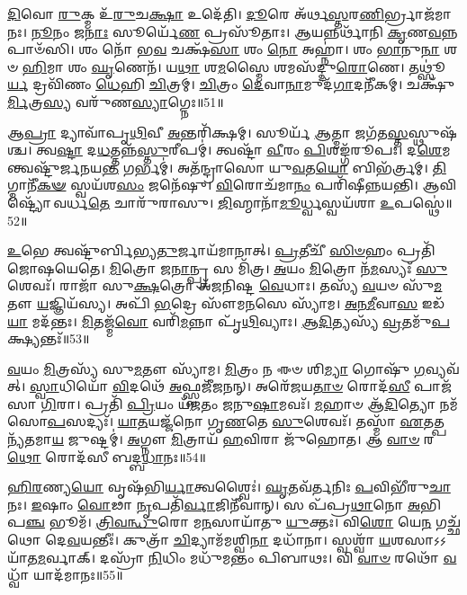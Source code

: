 \-\ul{𑌦𑌿}\-𑌵𑍋 \ul{𑌰𑍁}\-𑌕𑍍𑌮 𑌉᳴\-\ul{𑌰𑍁}\-𑌚\-\ul{𑌕𑍍𑌷𑌾} 𑌉𑌦𑍇᳴𑌤𑌿।
\-\ul{𑌦𑍂}\-𑌰𑍇 𑌅᳴𑌰𑍍𑌥\-\ul{𑌸𑍍𑌤}\-𑌰\-\ul{𑌣𑌿}\-𑌰𑍍𑌭𑍍𑌰𑌾𑌜᳴𑌮𑌾𑌨𑌃।
\-\ul{𑌨𑍂}\-𑌨𑌂 𑌜\-\ul{𑌨𑌾𑌃} 𑌸𑍂𑌰𑍍𑌯𑍇᳴\-\ul{𑌣} 𑌪𑍍𑌰𑌸𑍂᳴𑌤𑌾𑌃।
𑌆𑌯𑌨𑍍𑌨𑌰𑍍𑌥𑌾᳴𑌨𑌿 \ul{𑌕𑍃}\-𑌣\-\ul{𑌵}\-𑌨𑍍𑌨𑌪𑌾𑍞᳴𑌸𑌿।
𑌶𑌂 𑌨𑍋᳴ 𑌭\-\ul{𑌵} 𑌚𑌕𑍍𑌷᳴\-\ul{𑌸𑌾} 𑌶𑌂 \ul{𑌨𑍋} 𑌅𑌹𑍍𑌨𑌾॑।
𑌶𑌂 \ul{𑌭𑌾}\-𑌨𑍁\-\ul{𑌨𑌾} 𑌶𑍞 \ul{𑌹𑌿}\-𑌮𑌾 𑌶𑌂 \ul{𑌘𑍃}\-𑌣𑍇𑌨᳴।
𑌯\-\ul{𑌥𑌾} 𑌶\-\ul{𑌮}\-𑌸𑍍𑌮𑍈 𑌶𑌮𑌸᳴𑌦𑍍𑌦𑍁\-\ul{𑌰𑍋}\-𑌣𑍇।
𑌤𑌥𑍍𑌸𑍂॑\-\ul{𑌰𑍍𑌯} 𑌦𑍍𑌰𑌵𑌿᳴𑌣𑌂 \ul{𑌧𑍇}\-𑌹𑌿 \ul{𑌚𑌿}\-𑌤𑍍𑌰𑌮𑍍।
\-\ul{𑌚𑌿}\-𑌤𑍍𑌰𑌂 \ul{𑌦𑍇}\-𑌵𑌾\-\ul{𑌨𑌾}\-𑌮𑍁𑌦᳴\-\ul{𑌗𑌾}\-𑌦𑌨𑍀᳴𑌕𑌮𑍍।
𑌚𑌕𑍍𑌷𑍁᳴\-\ul{𑌰𑍍𑌮𑌿}\-𑌤𑍍𑌰\-\ul{𑌸𑍍𑌯} 𑌵𑌰𑍁᳴𑌣\-\ul{𑌸𑍍𑌯𑌾}\-𑌗𑍍𑌨𑍇𑌃॥51॥

𑌆\-\ul{𑌪𑍍𑌰𑌾} 𑌦𑍍𑌯𑌾𑌵𑌾᳴𑌪𑍃\-\ul{𑌥𑌿}\-𑌵𑍀 \ul{𑌅}\-𑌨𑍍𑌤𑌰𑌿᳴𑌕𑍍𑌷𑌮𑍍।
𑌸𑍂𑌰𑍍𑌯᳴ \ul{𑌆}\-𑌤𑍍𑌮𑌾 𑌜𑌗᳴𑌤\-\ul{𑌸𑍍𑌤}\-𑌸𑍍𑌥𑍁𑌷᳴𑌶𑍍𑌚।
𑌤𑍍𑌵\-\ul{𑌷𑍍𑌟𑌾} 𑌦\-\ul{𑌧}\-𑌤𑍍𑌤𑌨𑍍𑌨᳴\-\ul{𑌸𑍍𑌤𑍁}\-𑌰𑍀𑌪𑌮𑍍॑।
𑌤𑍍𑌵𑌷𑍍𑌟𑌾᳴ \ul{𑌵𑍀}\-𑌰𑌂 \ul{𑌪𑌿}\-𑌶𑌙𑍍𑌗᳴𑌰𑍂𑌪𑌃।
𑌦\-\ul{𑌶𑍇}\-𑌮𑌨𑍍𑌤𑍍𑌵𑌷𑍍𑌟𑍁᳴𑌰𑍍𑌜𑌨𑌯\-\ul{𑌨𑍍𑌤} 𑌗𑌰𑍍𑌭𑌮𑍍॑।
𑌅𑌤᳴𑌨𑍍𑌦𑍍𑌰𑌾𑌸𑍋 𑌯𑍁\-\ul{𑌵}\-𑌤\-\ul{𑌯𑍋} 𑌬𑌿𑌭᳴𑌰𑍍𑌤𑍍𑌰𑌮𑍍।
\-\ul{𑌤𑌿}\-𑌗𑍍𑌮𑌾𑌨𑍀᳴\-\ul{𑌕}\-\-\ul{𑍟} 𑌸𑍍𑌵𑌯᳴𑌶\-\ul{𑌸𑌂} 𑌜𑌨𑍇᳴𑌷𑍁।
\-\ul{𑌵𑌿}\-𑌰𑍋𑌚᳴𑌮𑌾\-\ul{𑌨𑌂} 𑌪𑌰𑌿᳴𑌷𑍀𑌨𑍍𑌨𑌯𑌨𑍍𑌤𑌿।
𑌆𑌵𑌿𑌷𑍍𑌟𑍍𑌯𑍋᳴ 𑌵𑌰𑍍𑌧\-\ul{𑌤𑍇} 𑌚𑌾𑌰𑍁᳴𑌰𑌾𑌸𑍁।
\-\ul{𑌜𑌿}\-𑌹𑍍𑌮𑌾𑌨𑌾᳴\-\ul{𑌮𑍂}\-𑌰𑍍𑌧𑍍𑌵𑌸𑍍𑌵𑌯᳴𑌶𑌾 \ul{𑌉}\-𑌪𑌸𑍍𑌥𑍇॑॥52॥

\-\ul{𑌉}\-𑌭𑍇 𑌤𑍍𑌵𑌷𑍍𑌟𑍁᳴𑌰𑍍𑌬𑌿𑌭𑍍𑌯\-\ul{𑌤𑍁}\-𑌰𑍍𑌜𑌾𑌯᳴𑌮𑌾𑌨𑌾𑌤𑍍।
\-\ul{𑌪𑍍𑌰}\-𑌤𑍀𑌚𑍀᳴ \ul{𑌸𑌿}\-\-\ul{𑍞}\-𑌹𑌂 𑌪𑍍𑌰𑌤𑌿᳴\-𑌜𑍋𑌷𑌯𑍇𑌤𑍇।
\-\ul{𑌮𑌿}\-𑌤𑍍𑌰𑍋 𑌜\-\ul{𑌨𑌾}\-𑌨𑍍𑌪𑍍𑌰 𑌸 𑌮𑌿᳴𑌤𑍍𑌰।
\-\ul{𑌅}\-𑌯𑌂 \ul{𑌮𑌿}\-𑌤𑍍𑌰𑍋 𑌨᳴\-\ul{𑌮}\-𑌸𑍍𑌯𑌃᳴ \ul{𑌸𑍁}\-𑌶𑍇𑌵𑌃᳴।
𑌰𑌾𑌜𑌾᳴ 𑌸𑍁\-\ul{𑌕𑍍𑌷}\-𑌤𑍍𑌰𑍋 𑌅᳴𑌜𑌨𑌿𑌷𑍍𑌟 \ul{𑌵𑍇}\-𑌧𑌾𑌃।
𑌤𑌸𑍍𑌯᳴ \ul{𑌵}\-𑌯𑍞 𑌸𑍁᳴\-\ul{𑌮}\-𑌤𑍗 \ul{𑌯}\-𑌜𑍍𑌞𑌿𑌯᳴𑌸𑍍𑌯।
𑌅𑌪𑌿᳴ \ul{𑌭}\-𑌦𑍍𑌰𑍇 𑌸𑍗᳴𑌮\-\ul{𑌨}\-𑌸𑍇 𑌸𑍍𑌯𑌾᳴𑌮।
\-\ul{𑌅}\-\-\ul{𑌨}\-\-\ul{𑌮𑍀}\-𑌵𑌾\-\ul{𑌸} 𑌇𑌡᳴\-\ul{𑌯𑌾} 𑌮𑌦᳴𑌨𑍍𑌤𑌃।
\-\ul{𑌮𑌿}\-𑌤𑌜𑍍𑌮᳴\-\ul{𑌵𑍋} 𑌵𑌰𑌿᳴\-\ul{𑌮}\-𑌨𑍍𑌨𑌾 𑌪𑍃᳴\-\ul{𑌥𑌿}\-𑌵𑍍𑌯𑌾𑌃।
\-\ul{𑌆}\-\-\ul{𑌦𑌿}\-𑌤𑍍𑌯𑌸𑍍𑌯᳴ \ul{𑌵𑍍𑌰}\-𑌤𑌮𑍁᳴\-\ul{𑌪}\-𑌕𑍍𑌷𑍍𑌯𑌨𑍍𑌤𑌃᳴॥53॥

\-\ul{𑌵}\-𑌯𑌂 \ul{𑌮𑌿}\-𑌤𑍍𑌰𑌸𑍍𑌯᳴ 𑌸𑍁\-\ul{𑌮}\-𑌤𑍗 𑌸𑍍𑌯𑌾᳴𑌮।
\-\ul{𑌮𑌿}\-𑌤𑍍𑌰𑌂 𑌨 𑌈𑍞 𑌶𑌿\-\ul{𑌮𑍍𑌯𑌾} 𑌗𑍋𑌷𑍁᳴ \ul{𑌗}\-𑌵𑍍𑌯𑌵᳴𑌤𑍍।
\-\ul{𑌸𑍍𑌵𑌾}\-𑌧𑌿𑌯𑍋᳴ \ul{𑌵𑌿}\-𑌦𑌥𑍇᳴ \ul{𑌅}\-𑌫𑍍𑌸𑍍𑌵𑌜𑍀᳴𑌜𑌨𑌨𑍍।
𑌅𑌰𑍇᳴𑌜𑌯\-\ul{𑌤𑌾}\-\-\ul{𑍞} 𑌰𑍋𑌦᳴\-\ul{𑌸𑍀} 𑌪𑌾𑌜᳴𑌸𑌾 \ul{𑌗𑌿}\-𑌰𑌾।
𑌪𑍍𑌰𑌤𑌿᳴ \ul{𑌪𑍍𑌰𑌿}\-𑌯𑌂 𑌯᳴\-\ul{𑌜}\-𑌤𑌂 \ul{𑌜}\-𑌨𑍁\-\ul{𑌷𑌾}\-𑌮𑌵𑌃᳴।
\-\ul{𑌮}\-𑌹𑌾𑍞 𑌆᳴\-\ul{𑌦𑌿}\-𑌤𑍍𑌯𑍋 𑌨𑌮᳴𑌸𑍋\-\ul{𑌪}\-𑌸𑌦𑍍𑌯𑌃᳴।
\-\ul{𑌯𑌾}\-\-\ul{𑌤}\-𑌯𑌜𑍍𑌜᳴𑌨𑍋 𑌗𑍃\-\ul{𑌣}\-𑌤𑍇 \ul{𑌸𑍁}\-𑌶𑍇𑌵𑌃᳴।
𑌤𑌸𑍍𑌮𑌾᳴ \ul{𑌏}\-𑌤𑌤𑍍𑌪𑌨𑍍𑌯᳴𑌤𑌮𑌾\-\ul{𑌯} 𑌜𑍁𑌷𑍍𑌟𑌮𑍍॑।
\-\ul{𑌅}\-𑌗𑍍𑌨𑍗 \ul{𑌮𑌿}\-𑌤𑍍𑌰𑌾𑌯᳴ \ul{𑌹}\-𑌵𑌿𑌰𑌾 𑌜𑍁᳴𑌹𑍋𑌤।
𑌆 \ul{𑌵𑌾}\-\-\ul{𑍞} 𑌰\-\ul{𑌥𑍋} 𑌰𑍋𑌦᳴𑌸𑍀 𑌬𑌦𑍍𑌬\-\ul{𑌧𑌾}\-𑌨𑌃॥54॥

\-\ul{𑌹𑌿}\-\-\ul{𑌰}\-𑌣𑍍𑌯\-\ul{𑌯𑍋} 𑌵𑍃𑌷᳴𑌭𑌿\-\ul{𑌰𑍍𑌯𑌾}\-𑌤𑍍𑌵𑌶𑍍𑌵𑍈𑌃॑।
\-\ul{𑌘𑍃}\-𑌤𑌵᳴𑌰𑍍𑌤𑌨𑌿𑌃 \ul{𑌪}\-𑌵𑌿𑌭𑍀᳴𑌰𑍁\-\ul{𑌚𑌾}\-𑌨𑌃।
\-\ul{𑌇}\-𑌷𑌾𑌂 \ul{𑌵𑍋}\-𑌢𑌾 \ul{𑌨𑍃}\-𑌪𑌤𑌿᳴\-\ul{𑌰𑍍𑌵𑌾}\-𑌜𑌿𑌨𑍀᳴𑌵𑌾𑌨𑍍।
𑌸 𑌪᳴𑌪𑍍𑌰\-\ul{𑌥𑌾}\-𑌨𑍋 \ul{𑌅}\-𑌭𑌿 𑌪\-\ul{𑌞𑍍𑌚} 𑌭𑍂𑌮᳴।
\-\ul{𑌤𑍍𑌰𑌿}\-\-\ul{𑌵}\-\-\ul{𑌨𑍍𑌧𑍁}\-𑌰𑍋 𑌮\-\ul{𑌨}\-𑌸𑌾𑌯𑌾᳴𑌤𑍁 \ul{𑌯𑍁}\-𑌕𑍍𑌤𑌃।
𑌵𑌿\-\ul{𑌶𑍋} 𑌯𑍇\-\ul{𑌨} 𑌗𑌚𑍍𑌛᳴𑌥𑍋 𑌦𑍇\-\ul{𑌵}\-𑌯𑌨𑍍𑌤𑍀𑌃॑।
𑌕𑍁𑌤𑍍𑌰𑌾᳴ \ul{𑌚𑌿}\-𑌦𑍍𑌯𑌾𑌮᳴𑌮𑌶𑍍𑌵𑌿\-\ul{𑌨𑌾} 𑌦𑌧𑌾᳴𑌨𑌾।
𑌸𑍍𑌵𑌶𑍍𑌵𑌾᳴ \ul{𑌯}\-𑌶𑌸𑌾\-𑌽𑌽𑌯𑌾᳴𑌤\-\ul{𑌮}\-𑌰𑍍𑌵𑌾𑌕𑍍।
𑌦𑌸𑍍𑌰𑌾᳴ \ul{𑌨𑌿}\-𑌧𑌿𑌂 𑌮𑌧𑍁᳴𑌮𑌨𑍍𑌤𑌂 𑌪𑌿𑌬𑌾𑌥𑌃।
𑌵𑌿 \ul{𑌵𑌾}\-\-\ul{𑍞} 𑌰𑌥𑍋᳴ \ul{𑌵}\-𑌧𑍍𑌵𑌾᳴ 𑌯𑌾𑌦᳴𑌮𑌾𑌨𑌃॥55॥

